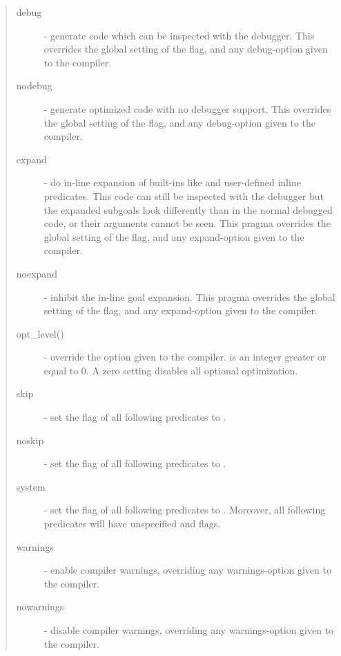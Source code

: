 \begin{quote}
\begin{description}
\item[debug] - generate code which can be inspected with the
debugger.
This overrides the global setting of the  flag,
and any debug-option given to the compiler.

\item[nodebug] - generate optimized code with no debugger support.
This overrides the global setting of the  flag,
and any debug-option given to the compiler.

\item[expand] - do in-line expansion of built-ins
like  and user-defined
inline predicates.
This code can still be inspected with the debugger but the expanded
subgoals look differently than in the normal debugged code,
or their arguments cannot be seen.
This pragma overrides the global setting of the  flag,
and any expand-option given to the compiler.

\item[noexpand] - inhibit the in-line goal expansion.
This pragma overrides the global setting of the  flag,
and any expand-option given to the compiler.

\item[opt_level()]
         - override the  option given to the
         compiler.  is an integer greater or equal to 0.  A zero
         setting disables all optional optimization.

\item[skip] - set the  flag of all following
predicates to .

\item[noskip] - set the  flag of all following
predicates to .

\item[system] - set the  flag of all following
predicates to .
Moreover, all following predicates will have unspecified
 and  flags.

\item[warnings] - enable compiler warnings, overriding any
warnings-option given to the compiler.

\item[nowarnings] - disable compiler warnings, overriding any
warnings-option given to the compiler.

\end{description}
\end{quote}

